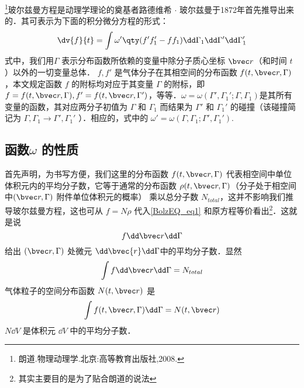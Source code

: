 

\footnote{朗道.物理动理学.北京:高等教育出版社,2008.}玻尔兹曼方程是动理学理论的奠基者路德维希 $\cdot$ 玻尔兹曼于1872年首先推导出来的．其可表示为下面的积分微分方程的形式：
\begin{equation}\label{BolzEQ_eq1}
\dv{f}{t}=\int\omega'\qty(f'f_1'-ff_1)\dd\Gamma_1\dd\Gamma'\dd\Gamma_1'
\end{equation}
式中，我们用$\Gamma$ 表示分布函数所依赖的变量中除分子质心坐标 $\bvec r$（和时间 $t$ ）以外的一切变量总体． $f,f'$ 是气体分子在其相空间的分布函数 $f(t,\bvec r,\Gamma)$，本文规定函数 $f$ 的附标均对应于其变量 $\Gamma$ 的附标，即$f=f(t,\bvec r,\Gamma),f'=f(t,\bvec r,\Gamma')$，等等．$\omega=\omega(\Gamma',\Gamma_1';\Gamma,\Gamma_1)$是其所有变量的函数，其对应两分子初值为 $\Gamma$ 和 $\Gamma_1$ 而结果为 $\Gamma'$ 和 $\Gamma_1'$ 的碰撞（该碰撞简记为 $\Gamma,\Gamma_1\rightarrow\Gamma',\Gamma_1'$ ）．相应的，式中的 $\omega'=\omega(\Gamma,\Gamma_1;\Gamma',\Gamma_1')$.

\subsection{函数$\omega$ 的性质}
首先声明，为书写方便，我们这里的分布函数 $f(t,\bvec r,\Gamma)$ 代表相空间中单位体积元内的平均分子数，它等于通常的分布函数 $\rho(t,\bvec r,\Gamma)$（分子处于相空间中$(\bvec r,\Gamma)$ 附件单位体积元的概率） 乘以总分子数 $N_{total}$，这并不影响我们推导玻尔兹曼方程，这也可从 $f=N\rho$ 代入\autoref{BolzEQ_eq1} 和原方程等价看出\footnote{其实主要目的是为了贴合朗道的说法}．这就是说
\begin{equation}
f\dd \bvec r\dd\Gamma
\end{equation}
给出 $(\bvec r,\Gamma)$ 处微元 $\dd\bvec{r}\dd\Gamma$中的平均分子数．显然
\begin{equation}
\int f\dd \bvec r\dd\Gamma=N_{total}
\end{equation}
气体粒子的空间分布函数 $N(t,\bvec r)$ 是
\begin{equation}
\int f(t,\bvec r,\Gamma)\dd \Gamma=N(t,\bvec r)
\end{equation}
 $N\dd V$ 是体积元 $\dd V$ 中的平均分子数．

